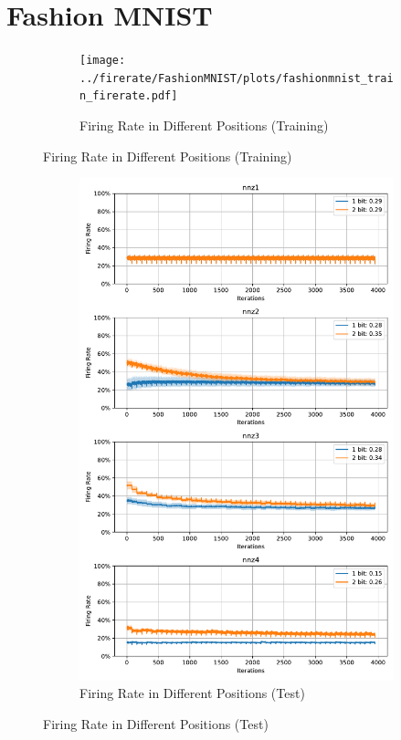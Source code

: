     \section{Fashion MNIST}
    \label{appendix:firerate_fashion_mnist}
        \begin{figure}[H]
            \centering
            \begin{subfigure}[H]{\textwidth}
                \centering
                \texttt{[image: ../firerate/FashionMNIST/plots/fashionmnist\_train\_firerate.pdf]}
                \caption{Firing Rate in Different Positions (Training)}
            \end{subfigure}
        \end{figure}
        \begin{figure}[H]
            \centering
            \ContinuedFloat
            \begin{subfigure}[H]{\textwidth}
                \centering
                \includegraphics[width=\textwidth]{../firerate/FashionMNIST/plots/fashionmnist_test_firerate.pdf}
                \caption{Firing Rate in Different Positions (Test)}
            \end{subfigure}
        \end{figure}
